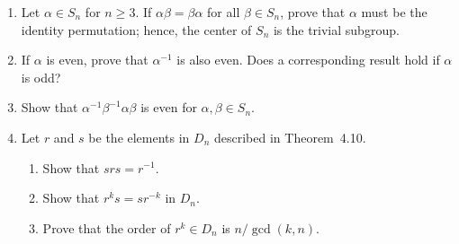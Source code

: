 {\begin{enumerate}
\begin{enumerate}
\bf \item \rm
Define the {\bfi orbit} of $x \in X$ under $\sigma \in
S_X$ to be the set 
$$
{\cal O}_{x, \sigma} = \{ y : x \sim y  \}.
$$
Compute the orbits of $\alpha, \beta, \gamma$ where
\begin{eqnarray*}
\alpha & = & (1254) \\
\beta & = & (123)(45)\\
\gamma & = & (13)(25).
\end{eqnarray*}
 
 \bf \item \rm
If ${\cal O}_{x, \sigma} \cap {\cal O}_{y, \sigma} \neq \emptyset$,
prove that ${\cal O}_{x, \sigma} = {\cal O}_{y, \sigma}$.  The orbits
under a permutation $\sigma$ are the equivalence classes corresponding
to the equivalence relation $\sim$.
 
 
\bf \item \rm
A subgroup $H$ of $S_X$ is {\bfi
transitive} if for every $x, y \in X$, 
there exists a $\sigma \in H$ such that $\sigma(x) =y$. Prove that
$\langle \sigma \rangle$ is transitive if and only if ${\cal O}_{x,
\sigma} = X$ for some $x \in X$. 
 
 
\end{enumerate}
 
 
\bf \item \rm
Let $\alpha \in S_n$ for $n \geq 3$. If $\alpha \beta = \beta \alpha$
for all $\beta \in S_n$, prove that $\alpha$ must be the identity
permutation; hence, the center of $S_n$ is the trivial subgroup. 
 
 
\bf \item \rm
If $\alpha$ is even, prove that $\alpha^{-1}$ is also even. Does a
corresponding result hold if $\alpha$ is odd? 
 
 
\bf \item \rm
Show that  $\alpha^{-1} \beta^{-1} \alpha \beta$ is even for $\alpha,
\beta \in S_n$. 
 
 
\bf \item \rm
Let $r$ and $s$ be the elements in $D_n$ described in Theorem~4.10.
\begin{enumerate}
 
 \bf \item \rm
Show that $srs = r^{-1}$.
 
 \bf \item \rm
Show that $r^k s = s r^{-k}$ in $D_n$.
 
 \bf \item \rm
Prove that the order of $r^k \in D_n$ is $n / \gcd(k,n)$.
  
\end{enumerate}
 
 
\end{enumerate}
}
 
 
 
 
